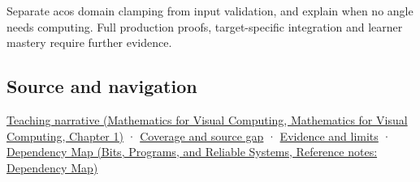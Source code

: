 Separate acos domain clamping from input validation, and explain when no angle needs computing. Full production proofs, target-specific integration and learner mastery require further evidence.

\subsection{Source and navigation}\label{appendix-e569e60e18e6-source-and-navigation}

\href{../02-Mathematics-for-Visual-Computing/main.pdf\#nameddest=01-foundations-i-ch017-an-angle-is-a-question-with-a-domain}{Teaching narrative (Mathematics for Visual Computing, Mathematics for Visual Computing, Chapter 1)} · \hyperref[appendix-fd090d982a15-phase-6---parts-501-600]{Coverage and source gap} · \hyperref[appendix-a103e7846d21-phase-6---source-analysis-and-verification]{Evidence and limits} · \href{../01-Bits-Programs-and-Reliable-Systems/main.pdf\#nameddest=appendix-4ad47bdd269a}{Dependency Map (Bits, Programs, and Reliable Systems, Reference notes: Dependency Map)}
